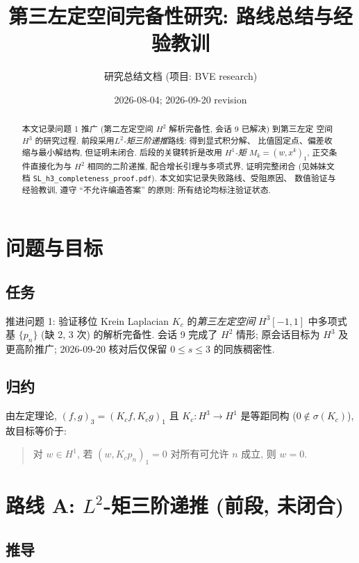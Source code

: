 \documentclass[UTF8]{ctexart}
\title{第三左定空间完备性研究: 路线总结与经验教训}
\author{研究总结文档 (项目: BVE research)}
\date{2026-08-04; 2026-09-20 revision}
\begin{document}
\maketitle

\begin{abstract}
本文记录问题 1 推广 (第二左定空间 $H^2$ 解析完备性, 会话 9 已解决) 到第三左定
空间 $H^3$ 的研究过程. 前段采用\emph{$L^2$-矩三阶递推}路线: 得到显式积分解、
比值固定点、偏差收缩与最小解结构, 但证明未闭合. 后段的关键转折是改用
\emph{$H^1$-矩} $M_k = (w, x^k)_1$, 正交条件直接化为与 $H^2$ 相同的二阶递推,
配合增长引理与多项式界, 证明完整闭合 (见姊妹文档
\texttt{SL\_h3\_completeness\_proof.pdf}). 本文如实记录失败路线、受阻原因、
数值验证与经验教训, 遵守 ``不允许编造答案'' 的原则: 所有结论均标注验证状态.
\end{abstract}

\tableofcontents

\section{问题与目标}

\subsection{任务}

推进问题 1: 验证移位 Krein Laplacian $K_c$ 的\emph{第三左定空间} $H^3[-1,1]$
中多项式基 $\{p_n\}$ (缺 2, 3 次) 的解析完备性. 会话 9 完成了 $H^2$ 情形;
原会话目标为 $H^3$ 及更高阶推广; 2026-09-20 核对后仅保留 $0\le s\le3$ 的同族稠密性.

\subsection{归约}

由左定理论, $(f,g)_3 = (K_c f, K_c g)_1$ 且 $K_c: H^3 \to H^1$ 是等距同构
($0 \notin \sigma(K_c)$), 故目标等价于:
\begin{quote}
	对 $w \in H^1$, 若 $(w, K_c p_n)_1 = 0$ 对所有可允许 $n$ 成立, 则 $w = 0$.
\end{quote}

\section{路线 A: \texorpdfstring{$L^2$}{L2}-矩三阶递推 (前段, 未闭合)}

\subsection{推导}
\end{document}
